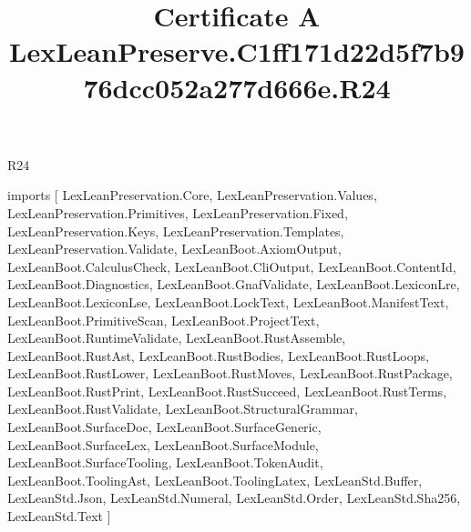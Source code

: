 \begin{lexlean}{R24}
\title{Certificate A LexLeanPreserve.C1ff171d22d5f7b976dcc052a277d666e.R24}
\begin{coremodule}
imports [
  LexLeanPreservation.Core,
  LexLeanPreservation.Values,
  LexLeanPreservation.Primitives,
  LexLeanPreservation.Fixed,
  LexLeanPreservation.Keys,
  LexLeanPreservation.Templates,
  LexLeanPreservation.Validate,
  LexLeanBoot.AxiomOutput,
  LexLeanBoot.CalculusCheck,
  LexLeanBoot.CliOutput,
  LexLeanBoot.ContentId,
  LexLeanBoot.Diagnostics,
  LexLeanBoot.GnafValidate,
  LexLeanBoot.LexiconLre,
  LexLeanBoot.LexiconLse,
  LexLeanBoot.LockText,
  LexLeanBoot.ManifestText,
  LexLeanBoot.PrimitiveScan,
  LexLeanBoot.ProjectText,
  LexLeanBoot.RuntimeValidate,
  LexLeanBoot.RustAssemble,
  LexLeanBoot.RustAst,
  LexLeanBoot.RustBodies,
  LexLeanBoot.RustLoops,
  LexLeanBoot.RustLower,
  LexLeanBoot.RustMoves,
  LexLeanBoot.RustPackage,
  LexLeanBoot.RustPrint,
  LexLeanBoot.RustSucceed,
  LexLeanBoot.RustTerms,
  LexLeanBoot.RustValidate,
  LexLeanBoot.StructuralGrammar,
  LexLeanBoot.SurfaceDoc,
  LexLeanBoot.SurfaceGeneric,
  LexLeanBoot.SurfaceLex,
  LexLeanBoot.SurfaceModule,
  LexLeanBoot.SurfaceTooling,
  LexLeanBoot.TokenAudit,
  LexLeanBoot.ToolingAst,
  LexLeanBoot.ToolingLatex,
  LexLeanStd.Buffer,
  LexLeanStd.Json,
  LexLeanStd.Numeral,
  LexLeanStd.Order,
  LexLeanStd.Sha256,
  LexLeanStd.Text
]


\end{coremodule}
\end{lexlean}
